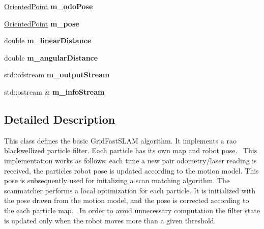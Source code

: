\begin{DoxyCompactItemize}
\hyperlink{structGMapping_1_1orientedpoint}{Oriented\+Point} {\bfseries m\+\_\+odo\+Pose}
\item 
\mbox{\label{classGMapping_1_1GridSlamProcessor_a4435f10953b33bff663a6a7b21acb6cd}} 
\hyperlink{structGMapping_1_1orientedpoint}{Oriented\+Point} {\bfseries m\+\_\+pose}
\item 
\mbox{\label{classGMapping_1_1GridSlamProcessor_a94ba410742ad6712b707e908e53da5e1}} 
double {\bfseries m\+\_\+linear\+Distance}
\item 
\mbox{\label{classGMapping_1_1GridSlamProcessor_aeede1ad148cba7c6080da5d8f00d4ac6}} 
double {\bfseries m\+\_\+angular\+Distance}
\item 
\mbox{\label{classGMapping_1_1GridSlamProcessor_a25d322edaf8cdbc585493934918b3a6a}} 
std\+::ofstream {\bfseries m\+\_\+output\+Stream}
\item 
\mbox{\label{classGMapping_1_1GridSlamProcessor_a7ad909f978d96737b5a336a15c65384c}} 
std\+::ostream \& {\bfseries m\+\_\+info\+Stream}
\end{DoxyCompactItemize}


\subsection{Detailed Description}
This class defines the basic Grid\+Fast\+S\+L\+AM algorithm. It implements a rao blackwellized particle filter. Each particle has its own map and robot pose.~\newline
 This implementation works as follows\+: each time a new pair odometry/laser reading is received, the particle\textquotesingle{}s robot pose is updated according to the motion model. This pose is subsequently used for initalizing a scan matching algorithm. The scanmatcher performs a local optimization for each particle. It is initialized with the pose drawn from the motion model, and the pose is corrected according to the each particle map.~\newline
 In order to avoid unnecessary computation the filter state is updated only when the robot moves more than a given threshold. 

